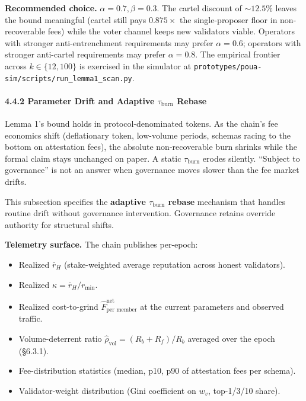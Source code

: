 \documentclass[
  11pt,
]{article}
\providecommand{\tightlist}{%
  \setlength{\itemsep}{0pt}\setlength{\parskip}{0pt}}
\begin{document}
\textbf{Recommended choice.} \(\alpha = 0.7, \beta = 0.3\). The cartel
discount of \(\sim 12.5\%\) leaves the bound meaningful (cartel still
pays \(0.875\times\) the single-proposer floor in non-recoverable fees)
while the voter channel keeps new validators viable. Operators with
stronger anti-entrenchment requirements may prefer \(\alpha = 0.6\);
operators with stronger anti-cartel requirements may prefer
\(\alpha = 0.8\). The empirical frontier across \(k \in \{12, 100\}\) is
exercised in the simulator at
\texttt{prototypes/poua-sim/scripts/run\_lemma1\_scan.py}.

\paragraph{\texorpdfstring{4.4.2 Parameter Drift and Adaptive
\(\tau_{\text{burn}}\)
Rebase}{4.4.2 Parameter Drift and Adaptive \textbackslash tau\_\{\textbackslash text\{burn\}\} Rebase}}\label{parameter-drift-and-adaptive-tau_textburn-rebase}

Lemma 1's bound holds in protocol-denominated tokens. As the chain's fee
economics shift (deflationary token, low-volume periods, schemas racing
to the bottom on attestation fees), the absolute non-recoverable burn
shrinks while the formal claim stays unchanged on paper. A static
\(\tau_{\text{burn}}\) erodes silently. ``Subject to governance'' is not
an answer when governance moves slower than the fee market drifts.

This subsection specifies the \textbf{adaptive \(\tau_{\text{burn}}\)
rebase} mechanism that handles routine drift without governance
intervention. Governance retains override authority for structural
shifts.

\textbf{Telemetry surface.} The chain publishes per-epoch:

\begin{itemize}
\tightlist
\item
  Realized \(\bar{r}_H\) (stake-weighted average reputation across
  honest validators).
\item
  Realized \(\kappa = \bar{r}_H / r_{\min}\).
\item
  Realized cost-to-grind \(\hat{F}^{\text{net}}_{\text{per member}}\) at
  the current parameters and observed traffic.
\item
  Volume-deterrent ratio \(\hat{\rho}_{\text{vol}} = (R_b + R_f) / R_b\)
  averaged over the epoch (§6.3.1).
\item
  Fee-distribution statistics (median, p10, p90 of attestation fees per
  schema).
\item
  Validator-weight distribution (Gini coefficient on \(w_v\), top-1/3/10
  share).
\end{itemize}
\end{document}
